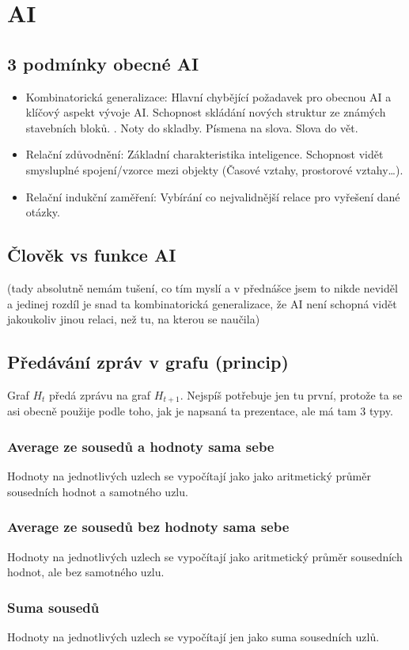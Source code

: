 \section{AI}
\subsection{3 podmínky obecné AI}
\begin{itemize}
    \item Kombinatorická generalizace: Hlavní chybějící požadavek pro obecnou AI a klíčový aspekt vývoje AI. Schopnost skládání nových struktur ze známých stavebních bloků. . Noty do skladby. Písmena na slova. Slova do vět.  
    \item Relační zdůvodnění: Základní charakteristika inteligence. Schopnost vidět smysluplné spojení/vzorce mezi objekty (Časové vztahy, prostorové vztahy\dots). 
    \item Relační indukční zaměření: Vybírání co nejvalidnější relace pro vyřešení dané otázky.

\end{itemize}
\subsection{Člověk vs funkce AI}
(tady absolutně nemám tušení, co tím myslí a v přednášce jsem to nikde neviděl a jedinej rozdíl je snad ta kombinatorická generalizace, že AI není schopná vidět jakoukoliv jinou relaci, než tu, na kterou se naučila)

\subsection{Předávání zpráv v grafu (princip)}

Graf $H_t$ předá zprávu na graf $H_{t+1}$. Nejspíš potřebuje jen tu první, protože ta se asi obecně použije podle toho, jak je napsaná ta prezentace, ale má tam 3 typy.
\subsubsection{Average ze sousedů a hodnoty sama sebe}
Hodnoty na jednotlivých uzlech se vypočítají jako jako aritmetický průměr sousedních hodnot a samotného uzlu.
\subsubsection{Average ze sousedů bez hodnoty sama sebe}
Hodnoty na jednotlivých uzlech se vypočítají jako aritmetický průměr sousedních hodnot, ale bez samotného uzlu.
\subsubsection{Suma sousedů}
Hodnoty na jednotlivých uzlech se vypočítají jen jako suma sousedních uzlů.


